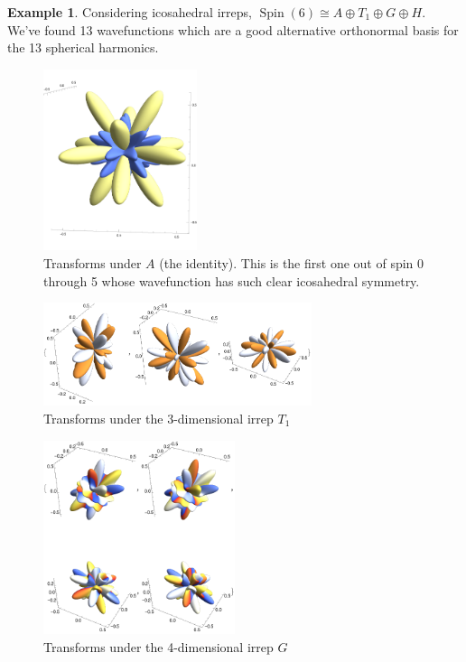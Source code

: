 \documentclass[12pt, letterpaper]{article}
\theoremstyle{definition} %
\newtheorem{ex}[thm]{Example}
\begin{document}
\begin{ex} Considering icosahedral irreps, $\operatorname{Spin}(6)\cong A\oplus T_1\oplus G\oplus H$. 
  We've found 13 wavefunctions which are a good 
  alternative orthonormal basis for the 13 spherical harmonics.

\begin{figure}[H]
\centering
\includegraphics[width=0.4\textwidth]{spindecomp61}
\caption{Transforms under $A$ (the identity). This is the first one out of spin 0 through 5 whose wavefunction has 
such clear icosahedral symmetry.}
\label{figure-spin61}
\end{figure}
  
\begin{figure}[H]
\centering
\includegraphics[width=0.7\textwidth]{spindecomp63}
\caption{Transforms under the 3-dimensional irrep $T_1$}
  \label{figure-spin63}
\end{figure}

\begin{figure}[H]
\centering
\includegraphics[width=0.5\textwidth]{spindecomp64}
\caption{Transforms under the 4-dimensional irrep $G$}
  \label{figure-spin64}
\end{figure}


\end{ex}
\end{document}
